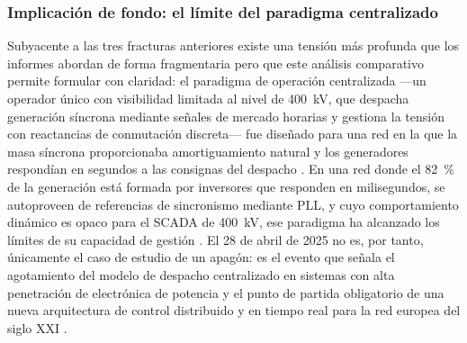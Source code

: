 \subsubsection*{Implicación de fondo: el límite del paradigma
centralizado}

Subyacente a las tres fracturas anteriores existe una tensión más
profunda que los informes abordan de forma fragmentaria pero que
este análisis comparativo permite formular con claridad: el
paradigma de operación centralizada ---un operador único con
visibilidad limitada al nivel de 400~kV, que despacha generación
síncrona mediante señales de mercado horarias y gestiona la tensión
con reactancias de conmutación discreta--- fue diseñado para una red
en la que la masa síncrona proporcionaba amortiguamiento natural y
los generadores respondían en segundos a las consignas del despacho
\cite{futured2024,nrel2025}. En una red donde el 82~\% de la
generación está formada por inversores que responden en
milisegundos, se autoproveen de referencias de sincronismo mediante
PLL, y cuyo comportamiento dinámico es opaco para el SCADA de
400~kV, ese paradigma ha alcanzado los límites de su capacidad de
gestión \cite{entsoe2025,nrel2025,futured2024}. El 28 de abril de
2025 no es, por tanto, únicamente el caso de estudio de un apagón:
es el evento que señala el agotamiento del modelo de despacho
centralizado en sistemas con alta penetración de electrónica de
potencia y el punto de partida obligatorio de una nueva
arquitectura de control distribuido y en tiempo real para la red
europea del siglo XXI \cite{entsoe2025,mitceepr2025,blackswan2025}.
